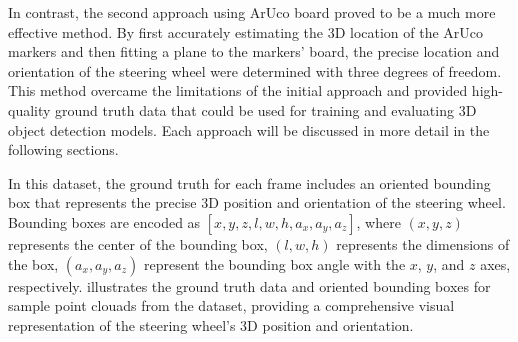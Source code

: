 In contrast, the second approach using ArUco board\cite{opencv_aruco_detection} proved to be a much more effective method. 
By first accurately estimating the 3D location of the ArUco markers and then fitting a plane to the markers' board, the precise location and orientation of the steering wheel were determined with three degrees of freedom. 
This method overcame the limitations of the initial approach and 
provided high-quality ground truth data that could be used for 
training and evaluating 3D object detection models.
Each approach will be discussed in more detail in the following sections.

In this dataset, the ground truth for each frame includes an 
oriented bounding box that represents the precise 3D position 
and orientation of the steering wheel. Bounding boxes are 
encoded as \([x, y, z, l, w, h, a_x, a_y, a_z]\), 
where \((x, y, z)\) represents the center of the bounding box, 
\((l, w, h)\) represents the dimensions of the box, 
\((a_x, a_y, a_z)\) represent the bounding box angle with 
the \(x\), \(y\), and \(z\) axes, respectively. 
 illustrates the ground truth data and oriented 
bounding boxes for sample point clouads from the dataset, 
providing a comprehensive visual representation of the 
steering wheel's 3D position and orientation.

